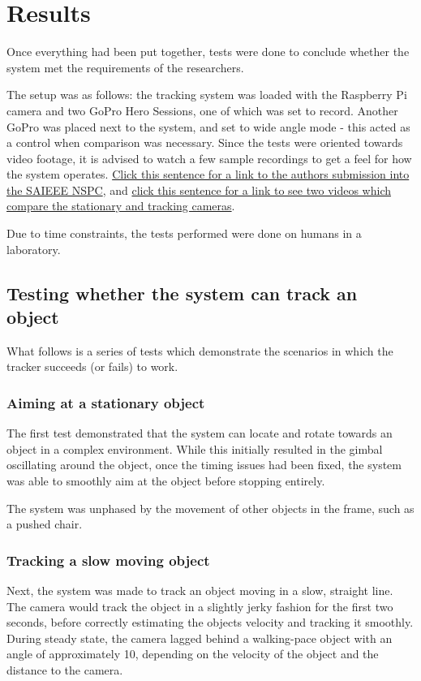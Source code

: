 \chapter{Results}\label{chap:results}

Once everything had been put together, tests were done to conclude whether the system met the requirements of the researchers.

The setup was as follows: the tracking system was loaded with the Raspberry Pi camera and two GoPro Hero Sessions, one of which was set to record. Another GoPro was placed next to the system, and set to wide angle mode - this acted as a control when comparison was necessary. Since the tests were oriented towards video footage, it is advised to watch a few sample recordings to get a feel for how the system operates. \href{https://www.youtube.com/watch?v=NjCOmwhG3zo}{Click this sentence for a link to the authors submission into the SAIEEE NSPC}, and \href{https://youtu.be/Oea_mKTjV5U}{click this sentence for a link to see two videos which compare the stationary and tracking cameras}.

Due to time constraints, the tests performed were done on humans in a laboratory.

\section{Testing whether the system can track an object}
What follows is a series of tests which demonstrate the scenarios in which the tracker succeeds (or fails) to work.

\subsection{Aiming at a stationary object}
The first test demonstrated that the system can locate and rotate towards an object in a complex environment. While this initially resulted in the gimbal oscillating around the object, once the timing issues had been fixed, the system was able to smoothly aim at the object before stopping entirely.

The system was unphased by the movement of other objects in the frame, such as a pushed chair.


\subsection{Tracking a slow moving object}
Next, the system was made to track an object moving in a slow, straight line. The camera would track the object in a slightly jerky fashion for the first two seconds, before correctly estimating the objects velocity and tracking it smoothly. During steady state, the camera lagged behind a walking-pace object with an angle of approximately 10\textdegree, depending on the velocity of the object and the distance to the camera.

